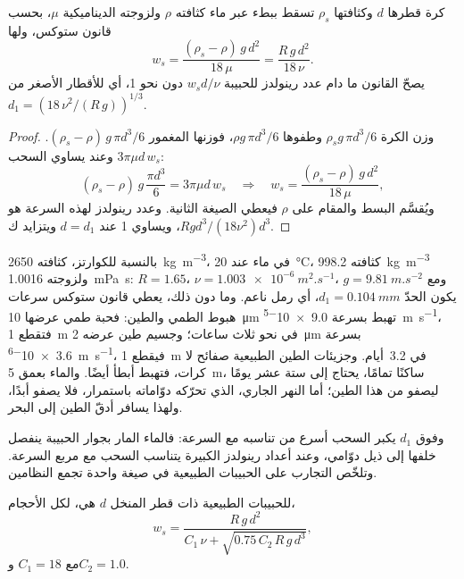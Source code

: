 \begin{proposition}\label{prop:b1:erosion-transport:stokes}
كرة قطرها $d$ وكثافتها $\rho_s$ تسقط ببطء عبر ماء كثافته $\rho$ ولزوجته الديناميكية $\mu$، بحسب قانون ستوكس، ولها 
\[
  w_s = \frac{(\rho_s - \rho)\,g\,d^2}{18\,\mu} = \frac{R\,g\,d^2}{18\,\nu}.
\]
يصحّ القانون ما دام عدد رينولدز للحبيبة $w_s d/\nu$ دون نحو 1، أي للأقطار الأصغر من $d_1 = \left(18\,\nu^2/(R\,g)\right)^{1/3}$.
\end{proposition}

\begin{proof}
وزن الكرة $\rho_s g\,\pi d^3/6$ وطفوها $\rho g\,\pi d^3/6$، فوزنها المغمور $(\rho_s - \rho)\,g\,\pi d^3/6$. وعند  يساوي السحب $3\pi\mu d\,w_s$:
\[
  (\rho_s - \rho)\,g\,\frac{\pi d^3}{6} = 3\pi\mu d\,w_s
  \quad\Longrightarrow\quad
  w_s = \frac{(\rho_s - \rho)\,g\,d^2}{18\,\mu},
\]
ويُقسَّم البسط والمقام على $\rho$ فيعطي الصيغة الثانية. وعدد رينولدز لهذه السرعة هو $R g d^3/(18\nu^2)$، ويساوي 1 عند
$d = d_1$ ويتزايد ك$d^3$.
\end{proof}

بالنسبة للكوارتز، كثافته \qty{2650}{kg.m^{-3}}، في ماء عند \qty{20}{\celsius}، كثافته \qty{998.2}{kg.m^{-3}} ولزوجته \qty{1.0016}{mPa.s}: $R =
1.65$، $\nu = \qty{1.003e-6}{m^2.s^{-1}}$، ومع $g =
\qty{9.81}{m.s^{-2}}$ يكون الحدّ $d_1 = \qty{0.104}{mm}$، أي رمل ناعم. وما دون ذلك، يعطي قانون ستوكس سرعات هبوط الطمي والطين: فحبة طمي عرضها \qty{10}{\micro m} تهبط بسرعة \qty{9.0e-5}{m.s^{-1}}، فتقطع \qty{1}{m} في نحو ثلاث ساعات؛ وجسيم طين عرضه \qty{2}{\micro m} بسرعة \qty{3.6e-6}{m.s^{-1}}، فيقطع \qty{1}{m} في \num{3.2}~أيام. وجزيئات الطين الطبيعية صفائح لا كرات، فتهبط أبطأ أيضًا. والماء بعمق \qty{5}{m}، ساكنًا تمامًا، يحتاج إلى ستة عشر يومًا ليصفو من هذا الطين؛ أما النهر الجاري، الذي تحرّكه دوّاماته باستمرار، فلا يصفو أبدًا، ولهذا يسافر أدقّ الطين إلى البحر.

وفوق $d_1$ يكبر السحب أسرع من تناسبه مع السرعة: فالماء المار بجوار الحبيبة ينفصل خلفها إلى ذيل دوّامي، وعند أعداد رينولدز الكبيرة يتناسب السحب مع مربع السرعة. وتلخّص التجارب على الحبيبات الطبيعية في صيغة واحدة تجمع النظامين.

\begin{proposition}\label{prop:b1:erosion-transport:combined}
 للحبيبات الطبيعية ذات قطر المنخل $d$ هي، لكل الأحجام،
\[
  w_s = \frac{R\,g\,d^2}{C_1\,\nu + \sqrt{0.75\,C_2\,R\,g\,d^3}},
\]
مع $C_1 = 18$ و$C_2 = 1.0$.
\end{proposition}
\admitted

